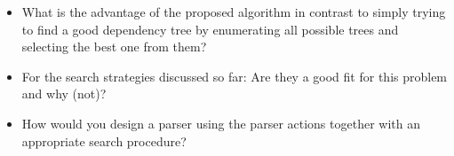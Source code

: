 \documentclass[ngerman]{fbi-aufgabenblatt}
\begin{document}
\begin{itemize}
\begin{itemize}
		\item What is the advantage of the proposed algorithm in contrast to simply trying to find a good dependency tree by enumerating all possible trees and selecting the best one from 			them? \newline
		\item For the search strategies discussed so far: Are they a good fit for this problem and why (not)? \newline 
		\item How would you design a parser using the parser actions together with an appropriate search procedure? \newline
	\end{itemize}
\end{itemize}
\end{document}

